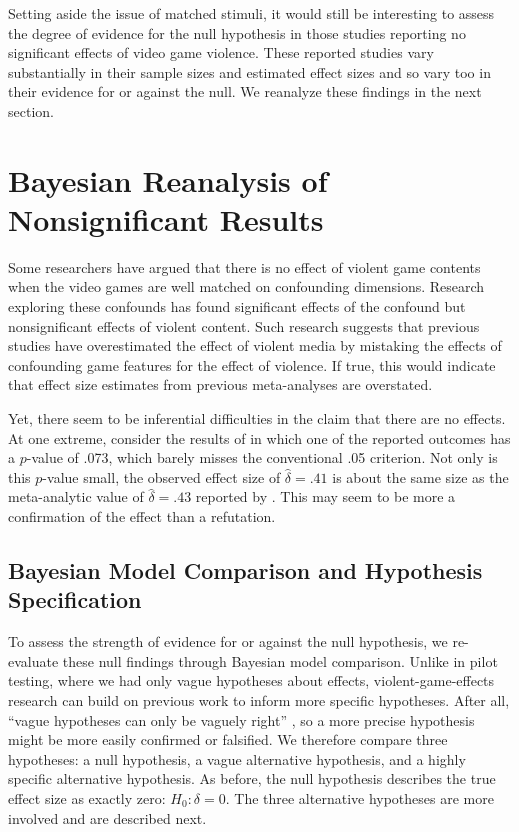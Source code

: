 \documentclass[man]{apa6}
\begin{document}
Setting aside the issue of matched stimuli, it would still be interesting to assess the degree of evidence for the null hypothesis in those studies reporting no significant effects of video game violence. These reported studies vary substantially in their sample sizes and estimated effect sizes and so vary too in their evidence for or against the null. We reanalyze these findings in the next section.

\section{Bayesian Reanalysis of Nonsignificant Results}
Some researchers have argued that there is no effect of violent game contents when the video games are well matched on confounding dimensions. Research exploring these confounds has found significant effects of the confound but nonsignificant effects of violent content. Such research suggests that previous studies have overestimated the effect of violent media by mistaking the effects of confounding game features for the effect of violence. If true, this would indicate that effect size estimates from previous meta-analyses \citep[e.g., $r = .21$ or $d = 0.43$,][]{Anderson:etal:2010} are overstated.  

Yet, there seem to be inferential difficulties in the claim that there are no effects.  At one extreme, consider the results of \citet{Elson:etal:2013} in which one of the reported outcomes has a $p$-value of .073, which barely misses the conventional .05 criterion.  Not only is this $p$-value small, the observed effect size of $\hat{\delta}=.41$ is about the same size as the meta-analytic value of $\hat{\delta}=.43$ reported by \citet{Anderson:etal:2010}.  This may seem to be more a confirmation of the effect than a refutation.

\subsection{Bayesian Model Comparison and Hypothesis Specification}
To assess the strength of evidence for or against the null hypothesis, we re-evaluate these null findings through Bayesian model comparison. Unlike in pilot testing, where we had only vague hypotheses about effects, violent-game-effects research can build on previous work to inform more specific hypotheses. After all, ``vague hypotheses can only be vaguely right'' \citep[p. 4]{Gallistel:2009}, so a more precise hypothesis might be more easily confirmed or falsified. We therefore compare three hypotheses: a null hypothesis, a vague alternative hypothesis, and a highly specific alternative hypothesis. As before, the null hypothesis describes the true effect size as exactly zero: $H_0: \delta = 0$. The three alternative hypotheses are more involved and are described next. 
\end{document}
